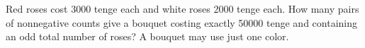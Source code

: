 Red roses cost 3000 tenge each and white roses 2000 tenge each. How many pairs of nonnegative counts give a bouquet costing exactly 50000 tenge and containing an odd total number of roses? A bouquet may use just one color.
